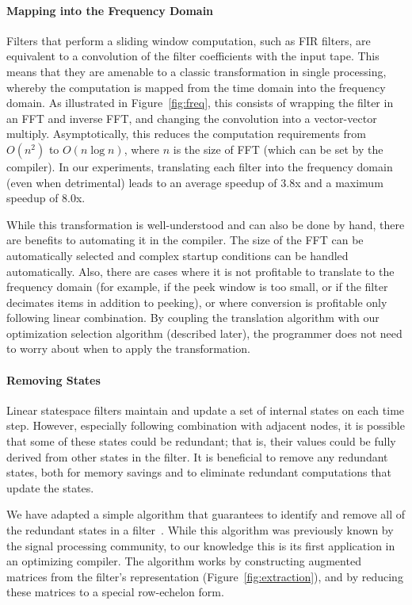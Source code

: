 \paragraph*{Mapping into the Frequency Domain}  Filters that perform a 
sliding window computation, such as FIR filters, are equivalent to a
convolution of the filter coefficients with the input tape.  This
means that they are amenable to a classic transformation in single
processing, whereby the computation is mapped from the time domain
into the frequency domain.  As illustrated in Figure~\ref{fig:freq},
this consists of wrapping the filter in an FFT and inverse FFT, and
changing the convolution into a vector-vector multiply.
Asymptotically, this reduces the computation requirements from
$O(n^2)$ to $O(n \log n)$, where $n$ is the size of FFT (which can be
set by the compiler).  In our experiments, translating each filter
into the frequency domain (even when detrimental) leads to an average
speedup of 3.8x and a maximum speedup of 8.0x.

While this transformation is well-understood and can also be done by
hand, there are benefits to automating it in the compiler.  The size
of the FFT can be automatically selected and complex startup
conditions can be handled automatically.  Also, there are cases where
it is not profitable to translate to the frequency domain (for
example, if the peek window is too small, or if the filter decimates
items in addition to peeking), or where conversion is profitable only
following linear combination.  By coupling the translation algorithm
with our optimization selection algorithm (described later), the
programmer does not need to worry about when to apply the
transformation.

\paragraph*{Removing States}  Linear statespace filters maintain and
update a set of internal states on each time step.  However,
especially following combination with adjacent nodes, it is possible
that some of these states could be redundant; that is, their values
could be fully derived from other states in the filter.  It is
beneficial to remove any redundant states, both for memory savings and
to eliminate redundant computations that update the states.

We have adapted a simple algorithm that guarantees to identify and
remove all of the redundant states in a filter~\cite{Mayne}.  While
this algorithm was previously known by the signal processing
community, to our knowledge this is its first application in an
optimizing compiler.  The algorithm works by constructing augmented
matrices from the filter's representation
(Figure~\ref{fig:extraction}), and by reducing these matrices to a
special row-echelon form.

